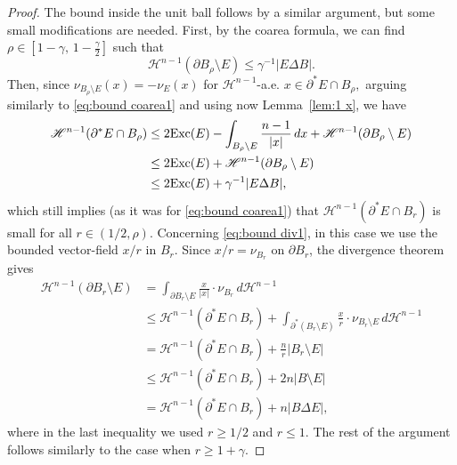 \documentclass[reqno,11pt]{amsart}
\numberwithin{equation}{section}
\theoremstyle{remark}
\begin{document}
\begin{proof}
The bound inside the unit ball follows by a similar argument, but some small modifications are needed.
First, by the coarea formula, we can find
$\rho\in [1-\gamma ,\,1-\frac \gamma 2]$ such that
$$\mathscr H^{n-1}(  \partial B_{\rho}\setminus E)\le   \gamma^{-1}|E\Delta B|.$$
Then, since
$\nu_{B_\rho\setminus E}(x)= -\nu_{E}(x)$ for $\mathscr H^{n-1}$-a.e. $x\in \partial^*E\cap B_{\rho},$
arguing similarly to \eqref{eq:bound coarea1} and using now Lemma~\ref{lem:1 x}, we have
\begin{equation*}
\begin{split}
\mathscr H^{n-1}(\partial^*E \cap B_{\rho}) &\leq 2 {\rm Exc}(E)- \int_{B_{\rho}\setminus E} \frac{n-1}{|x|} \,dx+\mathscr H^{n-1}(\partial B_\rho \setminus E)\\
&\leq 2 {\rm Exc}(E)+\mathscr H^{n-1}(\partial B_\rho \setminus E)\\
&\leq 2 {\rm Exc}(E)+ \gamma^{-1}|E\Delta B|,
\end{split}
\end{equation*}
which still implies (as it was for \eqref{eq:bound coarea1}) that $\mathscr H^{n-1}(\partial^*E \cap B_{r})$ is small for all $r \in(1/2, \rho).$
Concerning \eqref{eq:bound div1}, in this case we use the bounded vector-field
$x/r$ in $B_r$. Since $x/r=\nu_{B_r}$ on $\partial B_r$, the divergence theorem
gives
\begin{equation*}
\begin{split}
\mathscr H^{n-1}(\partial B_r\setminus E)&=\int_{\partial B_r\setminus E}\frac{x}{|x|}\cdot \nu_{B_r} \, d\mathscr H^{n-1} \\
&\le  \mathscr H^{n-1}(\partial^* E\cap B_r)
+\int_{\partial^*(B_r\setminus E)} \frac{x}{r}\cdot \nu_{B_r\setminus E} \, d\mathscr H^{n-1}  \\
&= \mathscr H^{n-1}(\partial^* E\cap B_r) + \frac n r |B_r\setminus E|\\
&\leq \mathscr H^{n-1}(\partial^* E\cap B_r) + 2n|B\setminus E|\\
&= \mathscr H^{n-1}(\partial^* E\cap B_r) + n|B\Delta E|,
\end{split}
\end{equation*}
where in the last inequality we used $r \geq 1/2$ and $r\leq 1$.
The rest of the argument follows similarly to the case when $r\ge  1 +\gamma$.
\end{proof}
\end{document}
